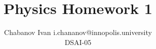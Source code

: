 

\begin{titlepage}
    \title{Physics Homework 1}
    \author{Chabanov Ivan \bigbreak i.chananov@innopolis.university\\DSAI-05}
    \maketitle

\end{titlepage}